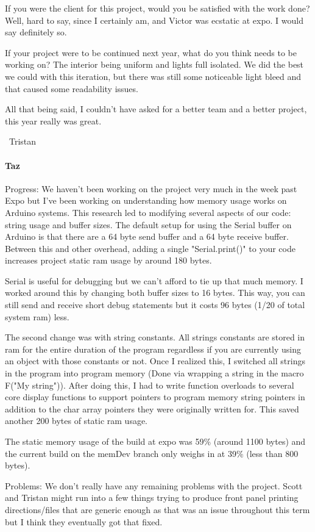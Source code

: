 \documentclass[onecolumn, draftclsnofoot,10pt, compsoc]{IEEEtran}
\begin{document}
If you were the client for this project, would you be satisfied with the work done? Well, hard to say, since I certainly am, and Victor was ecstatic at expo. I would say definitely so.

If your project were to be continued next year, what do you think needs to be working on? The interior being uniform and lights full isolated. We did the best we could with this iteration, but there was still some noticeable light bleed and that caused some readability issues.

All that being said, I couldn't have asked for a better team and a better project, this year really was great.

~Tristan
\paragraph{Taz}
Progress: We haven't been working on the project very much in the week past Expo but I've been working on understanding how memory usage works on Arduino systems. This research led to modifying several aspects of our code: string usage and buffer sizes. The default setup for using the Serial buffer on Arduino is that there are a 64 byte send buffer and a 64 byte receive buffer. Between this and other overhead, adding a single "Serial.print()" to your code increases project static ram usage by around 180 bytes.

Serial is useful for debugging but we can't afford to tie up that much memory. I worked around this by changing both buffer sizes to 16 bytes. This way, you can still send and receive short debug statements but it costs 96 bytes (1/20 of total system ram) less.

The second change was with string constants. All strings constants are stored in ram for the entire duration of the program regardless if you are currently using an object with those constants or not. Once I realized this, I switched all strings in the program into program memory (Done via wrapping a string in the macro F("My string")). After doing this, I had to write function overloads to several core display functions to support pointers to program memory string pointers in addition to the char array pointers they were originally written for. This saved another 200 bytes of static ram usage.

The static memory usage of the build at expo was 59\% (around 1100 bytes) and the current build on the memDev branch only weighs in at 39\% (less than 800 bytes).

Problems: We don't really have any remaining problems with the project. Scott and Tristan might run into a few things trying to produce front panel printing directions/files that are generic enough as that was an issue throughout this term but I think they eventually got that fixed.
\end{document}
